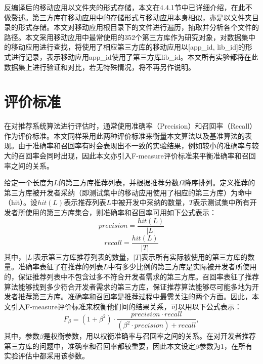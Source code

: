 反编译后的移动应用以文件夹的形式存储，本文在4.4.1节中已详细介绍，在此不做赘述。第三方库在移动应用中的存储形式与移动应用本身相似，亦是以文件夹目录的形式存储。本文对移动应用根目录下的文件进行遍历，抽取并分析各个文件的路径。本文采用移动应用中最常使用的352个第三方库作为研究对象，对数据集中的移动应用进行查找，将使用了相应第三方库的移动应用以\textsf{[app\_id, lib\_id]}的形式进行记录，表示移动应用\textsf{app\_id}使用了第三方库\textsf{lib\_id}。本文所有实验都将在此数据集上进行验证和对比，若无特殊情况，将不再另作说明。



\section{评价标准}
在对推荐系统算法进行评估时，通常使用准确率（Precision）\cite{yin2013app}和召回率（Recall）\cite{runeson2007detection}作为评价标准。本文同样采用此两种评价标准来衡量本文算法以及基准算法的表现。由于准确率和召回率有时会表现出不一致的实验结果，例如较小的准确率与较大的召回率会同时出现，因此本文亦引入F-measure\cite{rijsbergen1979information}评价标准来平衡准确率和召回率之间的关系。

给定一个长度为$L$的第三方库推荐列表，并根据推荐分数$\Omega$降序排列。定义推荐的第三方库被开发者采纳（即测试集中的移动应用使用了相应的第三方库）为命中（hit）。设$hit(L)$表示推荐列表$L$中被开发中采纳的数量，$T$表示测试集中所有开发者所使用的第三方库集合，则准确率和召回率可用如下公式表示：
\begin{equation}
precision = \frac{hit(L)}{|L|}
\end{equation}
\begin{equation}
recall = \frac{hit(L)}{|T|}
\end{equation}
其中，$|L|$表示第三方库推荐列表的数量，$|T|$表示所有实际被使用的第三方库的数量。准确率表征了在推荐的列表$L$中有多少比例的第三方库是实际被开发者所使用的，保证推荐列表中不包含过多不符合开发者需求的第三方库。召回率表征了推荐算法能够找到多少符合开发者需求的第三方库，保证推荐算法能够尽可能多地为开发者推荐第三方库。准确率和召回率是推荐过程中最需关注的两个方面。因此，本文引入F-measure评价标准来权衡他们间的结果关系，可以用以下公式表示：
\begin{equation}
F_\beta = (1+\beta^2) \cdot \frac{precision \cdot recall}{(\beta^2 \cdot precision) + recall},
\end{equation}
其中，参数$\beta$是权衡参数，用以权衡准确率与召回率之间的关系。在对开发者推荐第三方库的问题中，准确率和召回率都较重要，因此本文设定$\beta$参数为1，在所有实验评估中都采用该参数。

